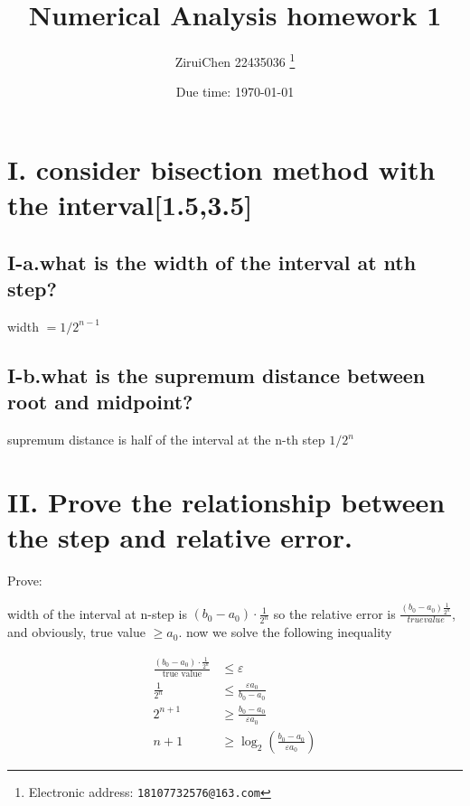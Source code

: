 \documentclass[a4paper]{article}
\begin{document}
\title{Numerical Analysis homework 1}

\author{ZiruiChen 22435036
  \thanks{Electronic address: \texttt{18107732576@163.com}}}


\date{Due time: \today}

\maketitle






\section*{I. consider bisection method with the interval[1.5,3.5]}

\subsection*{I-a.what is the width of the interval at nth step?}

width $= 1/2^{n-1}$

\subsection*{I-b.what is the supremum distance between root and midpoint?}

supremum distance is half of the interval at the n-th step $1/2^{n}$

\section*{II. Prove the relationship between the step and relative error.}
Prove:

width of the interval at n-step is $(b_{0}-a_{0}) \cdot \frac{1}{2^{n}}$
so the relative error is $\frac{(b_{0}-a_{0})\frac{1}{2^{n}}}{true value}$,
and obviously, true value $\geq a_{0}$.
now we solve the following inequality 

\begin{align}
  \frac{(b_{0}-a_{0}) \cdot \frac{1}{2^{n}}}{\text{true value}} & \leq \varepsilon \\
  \frac{1}{2^{n}} & \leq \frac{\varepsilon a_{0}}{b_{0}-a_{0}} \\
  2^{n+1} & \geq \frac{b_{0}-a_{0}}{\varepsilon a_{0}} \\
  n+1 & \geq \log_{2}\left(\frac{b_{0}-a_{0}}{\varepsilon a_{0}}\right)
\end{align}
\end{document}
